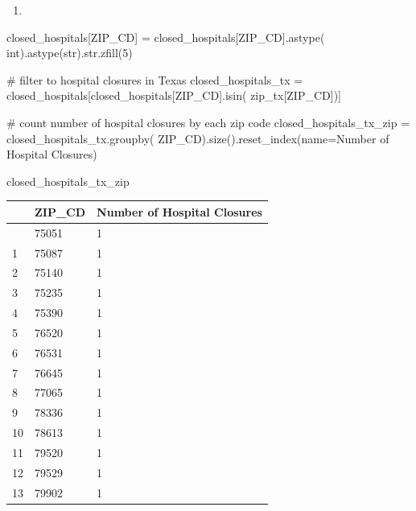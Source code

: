 \documentclass[
  letterpaper,
  DIV=11,
  numbers=noendperiod]{scrartcl}
\newenvironment{Shaded}{\begin{snugshade}}{\end{snugshade}}
\newcommand{\BuiltInTok}[1]{\textcolor[rgb]{0.00,0.23,0.31}{#1}}
\newcommand{\CommentTok}[1]{\textcolor[rgb]{0.37,0.37,0.37}{#1}}
\newcommand{\DecValTok}[1]{\textcolor[rgb]{0.68,0.00,0.00}{#1}}
\newcommand{\NormalTok}[1]{\textcolor[rgb]{0.00,0.23,0.31}{#1}}
\newcommand{\OperatorTok}[1]{\textcolor[rgb]{0.37,0.37,0.37}{#1}}
\newcommand{\StringTok}[1]{\textcolor[rgb]{0.13,0.47,0.30}{#1}}
\providecommand{\tightlist}{%
  \setlength{\itemsep}{0pt}\setlength{\parskip}{0pt}}\usepackage{longtable,booktabs,array}
\begin{document}
\begin{enumerate}
\def\labelenumi{\arabic{enumi}.}
\tightlist
\item
\end{enumerate}

\begin{Shaded}
\begin{Highlighting}[]
\NormalTok{closed\_hospitals[}\StringTok{\textquotesingle{}ZIP\_CD\textquotesingle{}}\NormalTok{] }\OperatorTok{=}\NormalTok{ closed\_hospitals[}\StringTok{\textquotesingle{}ZIP\_CD\textquotesingle{}}\NormalTok{].astype(}
    \BuiltInTok{int}\NormalTok{).astype(}\BuiltInTok{str}\NormalTok{).}\BuiltInTok{str}\NormalTok{.zfill(}\DecValTok{5}\NormalTok{)}

\CommentTok{\# filter to hospital closures in Texas}
\NormalTok{closed\_hospitals\_tx }\OperatorTok{=}\NormalTok{ closed\_hospitals[closed\_hospitals[}\StringTok{\textquotesingle{}ZIP\_CD\textquotesingle{}}\NormalTok{].isin(}
\NormalTok{    zip\_tx[}\StringTok{\textquotesingle{}ZIP\_CD\textquotesingle{}}\NormalTok{])]}

\CommentTok{\# count number of hospital closures by each zip code}
\NormalTok{closed\_hospitals\_tx\_zip }\OperatorTok{=}\NormalTok{ closed\_hospitals\_tx.groupby(}
    \StringTok{\textquotesingle{}ZIP\_CD\textquotesingle{}}\NormalTok{).size().reset\_index(name}\OperatorTok{=}\StringTok{\textquotesingle{}Number of Hospital Closures\textquotesingle{}}\NormalTok{)}

\NormalTok{closed\_hospitals\_tx\_zip}
\end{Highlighting}
\end{Shaded}

\begin{longtable}[]{@{}lll@{}}
\toprule\noalign{}
& ZIP\_CD & Number of Hospital Closures \\
\midrule\noalign{}
\endhead
\bottomrule\noalign{}
\endlastfoot
0 & 75051 & 1 \\
1 & 75087 & 1 \\
2 & 75140 & 1 \\
3 & 75235 & 1 \\
4 & 75390 & 1 \\
5 & 76520 & 1 \\
6 & 76531 & 1 \\
7 & 76645 & 1 \\
8 & 77065 & 1 \\
9 & 78336 & 1 \\
10 & 78613 & 1 \\
11 & 79520 & 1 \\
12 & 79529 & 1 \\
13 & 79902 & 1 \\
\end{longtable}
\end{document}
